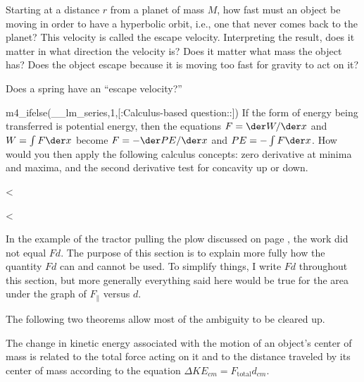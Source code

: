 \begin{dq}
Starting at a distance $r$ from a planet of mass $M$, how
fast must an object be moving in order to have a hyperbolic
orbit, i.e., one that never comes back to the planet? This
velocity is called the escape velocity. Interpreting the
result, does it matter in what direction the velocity is?
Does it matter what mass the object has? Does the object
escape because it is moving too fast for gravity to act on it?
\end{dq}

\begin{dq}
Does a spring have an ``escape velocity?''
\end{dq}

\begin{dq}
m4_ifelse(__lm_series,1,[:Calculus-based question::]) If the form of energy being
transferred is potential energy, then the equations 
$F=\der W/\der x$ and $W=\int F \der x$
become
$F=-\der PE/\der x$ and $PE=-\int F \der x$.
How would you then apply the following
calculus concepts: zero derivative at minima and maxima, and
the second derivative test for concavity up or down.
\end{dq}

<%

<%

In the example of the tractor pulling the plow discussed on page
\pageref{plow-discussion},
the work did not equal $Fd$.
The purpose of this section is to explain more fully how the
quantity $Fd$ can and cannot be used. To simplify
things, I write $Fd$ throughout this section, but more
generally everything said here would be true for the area
under the graph of $F_{\parallel}$ versus $d$.

The following two theorems
allow most of the ambiguity to be cleared up.

\begin{lessimportant}
The change in kinetic energy associated with the motion of
an object's center of mass is related to the total force acting
on it and to the distance traveled by its center of mass
according to the equation $\Delta KE_{cm}=F_\text{total}d_{cm}$.
\end{lessimportant}

